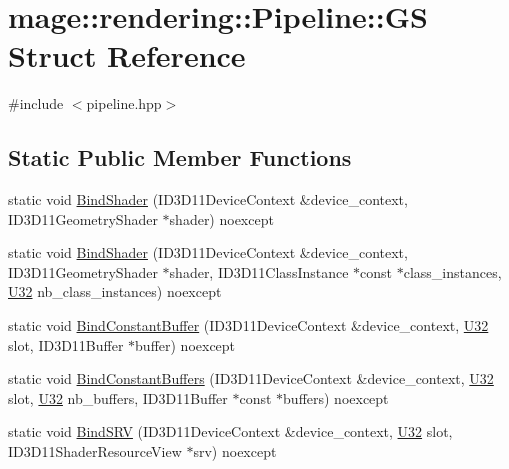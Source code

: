 \hypertarget{structmage_1_1rendering_1_1_pipeline_1_1_g_s}{}\section{mage\+:\+:rendering\+:\+:Pipeline\+:\+:GS Struct Reference}
\label{structmage_1_1rendering_1_1_pipeline_1_1_g_s}


{\ttfamily \#include $<$pipeline.\+hpp$>$}

\subsection*{Static Public Member Functions}
\begin{DoxyCompactItemize}
\item 
static void \mbox{\hyperlink{structmage_1_1rendering_1_1_pipeline_1_1_g_s_a6e4afbcf045847256c371c9f2d4c840e}{Bind\+Shader}} (I\+D3\+D11\+Device\+Context \&device\+\_\+context, I\+D3\+D11\+Geometry\+Shader $\ast$shader) noexcept
\item 
static void \mbox{\hyperlink{structmage_1_1rendering_1_1_pipeline_1_1_g_s_a0c5eb5417e9c524a22804748c41da210}{Bind\+Shader}} (I\+D3\+D11\+Device\+Context \&device\+\_\+context, I\+D3\+D11\+Geometry\+Shader $\ast$shader, I\+D3\+D11\+Class\+Instance $\ast$const $\ast$class\+\_\+instances, \mbox{\hyperlink{namespacemage_aa5d6eaabaac3cdd01873d6a3d27e90f3}{U32}} nb\+\_\+class\+\_\+instances) noexcept
\item 
static void \mbox{\hyperlink{structmage_1_1rendering_1_1_pipeline_1_1_g_s_a3819a60a62e21bd9de227dd05ae77718}{Bind\+Constant\+Buffer}} (I\+D3\+D11\+Device\+Context \&device\+\_\+context, \mbox{\hyperlink{namespacemage_aa5d6eaabaac3cdd01873d6a3d27e90f3}{U32}} slot, I\+D3\+D11\+Buffer $\ast$buffer) noexcept
\item 
static void \mbox{\hyperlink{structmage_1_1rendering_1_1_pipeline_1_1_g_s_a96e8285aad5725d6ffb7c121e807c584}{Bind\+Constant\+Buffers}} (I\+D3\+D11\+Device\+Context \&device\+\_\+context, \mbox{\hyperlink{namespacemage_aa5d6eaabaac3cdd01873d6a3d27e90f3}{U32}} slot, \mbox{\hyperlink{namespacemage_aa5d6eaabaac3cdd01873d6a3d27e90f3}{U32}} nb\+\_\+buffers, I\+D3\+D11\+Buffer $\ast$const $\ast$buffers) noexcept
\item 
static void \mbox{\hyperlink{structmage_1_1rendering_1_1_pipeline_1_1_g_s_ae5e320c00e88b66a5825624338550fe5}{Bind\+S\+RV}} (I\+D3\+D11\+Device\+Context \&device\+\_\+context, \mbox{\hyperlink{namespacemage_aa5d6eaabaac3cdd01873d6a3d27e90f3}{U32}} slot, I\+D3\+D11\+Shader\+Resource\+View $\ast$srv) noexcept

\end{DoxyCompactItemize}
